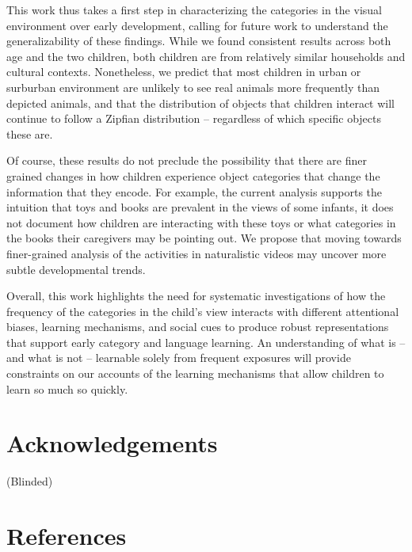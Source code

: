 \documentclass[10pt, letterpaper]{article}
\begin{document}
This work thus takes a first step in characterizing the categories in
the visual environment over early development, calling for future work
to understand the generalizability of these findings. While we found
consistent results across both age and the two children, both children
are from relatively similar households and cultural contexts.
Nonetheless, we predict that most children in urban or surburban
environment are unlikely to see real animals more frequently than
depicted animals, and that the distribution of objects that children
interact will continue to follow a Zipfian distribution -- regardless of
which specific objects these are.

Of course, these results do not preclude the possibility that there are
finer grained changes in how children experience object categories that
change the information that they encode. For example, the current
analysis supports the intuition that toys and books are prevalent in the
views of some infants, it does not document how children are interacting
with these toys or what categories in the books their caregivers may be
pointing out. We propose that moving towards finer-grained analysis of
the activities in naturalistic videos may uncover more subtle
developmental trends.

Overall, this work highlights the need for systematic investigations of
how the frequency of the categories in the child's view interacts with
different attentional biases, learning mechanisms, and social cues to
produce robust representations that support early category and language
learning. An understanding of what is -- and what is not -- learnable
solely from frequent exposures will provide constraints on our accounts
of the learning mechanisms that allow children to learn so much so
quickly.

\hypertarget{acknowledgements}{%
\section{Acknowledgements}\label{acknowledgements}}

(Blinded)

\hypertarget{references}{%
\section{References}\label{references}}

\setlength{\parindent}{-0.1in}
\setlength{\leftskip}{0.125in}

\noindent
\end{document}
